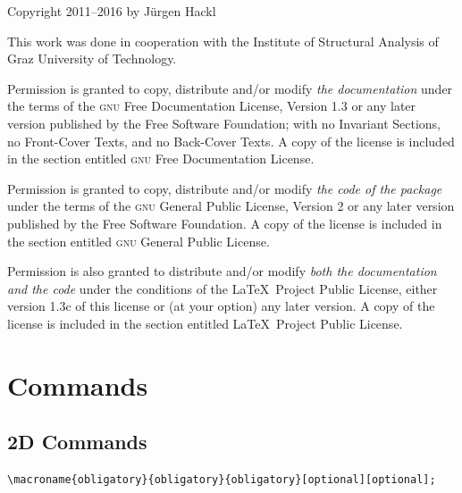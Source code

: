 \documentclass[%
  a4paper,
  BCOR=20mm,
  numbers=noenddot,
  twoside,
  parskip=half,
  openright,
  version=last,
]{scrreprt}
\begin{document}
  Copyright 2011--2016 by J\"urgen Hackl

\medskip
This work was done in cooperation with the Institute of Structural Analysis of Graz University of Technology.

  \medskip
  Permission is granted to copy, distribute and/or modify \emph{the documentation} under the terms of the \textsc{gnu} Free Documentation License, Version 1.3 or any later version published by the Free Software Foundation; with no Invariant Sections, no Front-Cover Texts, and no Back-Cover Texts. A copy of the license is included in the section entitled \textsc{gnu} Free Documentation License.

  \medskip
  Permission is granted to copy, distribute and/or modify \emph{the code of the package} under the terms of the \textsc{gnu} General Public License, Version 2 or any later version published by the Free Software Foundation. A copy of the license is included in the section entitled \textsc{gnu} General Public License.

  \medskip
  Permission is also granted to distribute and/or modify \emph{both the documentation and the code} under the conditions of the \LaTeX\ Project Public License, either version 1.3c of this license or (at your option) any later version. A copy of the license is included in the section entitled \LaTeX\ Project Public License.


\tableofcontents
\cleardoubleplainpage

\setcounter{page}{1}




\chapter{Commands}
\label{sec:Befehlsubersicht}

\section{2D Commands}
\label{sec:2dcom}

\begin{lstlisting}[emph={macroname},backgroundcolor=\color{red!10}]
		\macroname{obligatory}{obligatory}{obligatory}[optional][optional];
\end{lstlisting}\vspace{-7mm}
\end{document}
